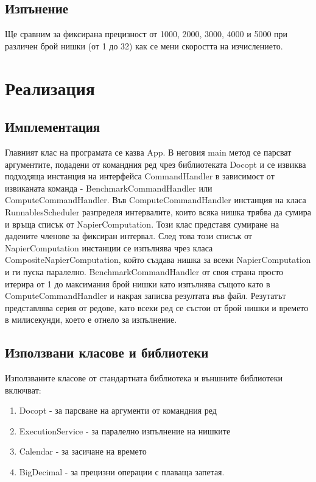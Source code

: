 \section{Изпънение}

Ще сравним за фиксирана прецизност от 1000, 2000, 3000, 4000 и 5000 при различен брой нишки (от 1 до 32) как се мени скоростта на изчислението.

\chapter{Реализация}

\section{Имплементация}

Главният клас на програмата се казва App. В неговия main метод се парсват аргументите, подадени от командния ред чрез библиотеката Docopt и се извиква подходяща инстанция на интерфейса CommandHandler в зависимост от извиканата команда - BenchmarkCommandHandler или ComputeCommandHandler. Във ComputeCommandHandler инстанция на класа RunnablesScheduler разпределя интервалите, които всяка нишка трябва да сумира и връща списък от NapierComputation. Този клас представя сумиране на дадените членове за фиксиран интервал. След това този списък от NapierComputation инстанции се изпълнява чрез класа CompositeNapierComputation, който създава нишка за всеки NapierComputation и ги пуска паралелно. BenchmarkCommandHandler от своя страна просто итерира от 1 до максимания брой нишки като изпълнява същото като в ComputeCommandHandler и накрая записва резултата във файл. Резутатът представлява серия от редове, като всеки ред се състои от брой нишки и времето в милисекунди, което е отнело за изпълнение.

\section{Използвани класове и библиотеки}

Използваните класове от стандартната библиотека и външните библиотеки включват:

\begin{enumerate}
    \item Docopt - за парсване на аргументи от командния ред
    \item ExecutionService - за паралелно изпълнение на нишките
    \item Calendar - за засичане на времето
    \item BigDecimal - за прецизни операции с плаваща запетая.
\end{enumerate}

